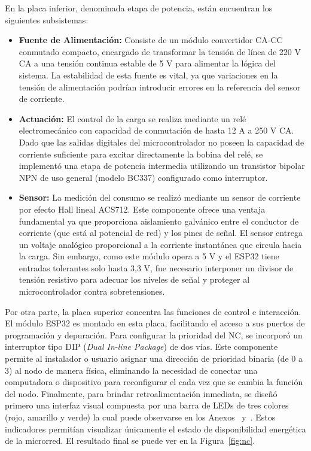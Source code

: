 En la placa inferior, denominada etapa de potencia, están encuentran los siguientes subsistemas:
\begin{itemize}
    \item \textbf{Fuente de Alimentación:} Consiste de un módulo convertidor CA-CC conmutado compacto, encargado de transformar la tensión de línea de 220 V CA a una tensión continua estable de 5 V para alimentar la lógica del sistema. La estabilidad de esta fuente es vital, ya que variaciones en la tensión de alimentación podrían introducir errores en la referencia del sensor de corriente.
    \item \textbf{Actuación:} El control de la carga se realiza mediante un relé electromecánico con capacidad de conmutación de hasta 12 A a 250 V CA. Dado que las salidas digitales del microcontrolador no poseen la capacidad de corriente suficiente para excitar directamente la bobina del relé, se implementó una etapa de potencia intermedia utilizando un transistor bipolar NPN de uso general (modelo BC337) configurado como interruptor.
    \item \textbf{Sensor:} La medición del consumo se realizó mediante un sensor de corriente por efecto Hall lineal ACS712. Este componente ofrece una ventaja fundamental ya que proporciona aislamiento galvánico entre el conductor de corriente (que está al potencial de red) y los pines de señal. El sensor entrega un voltaje analógico proporcional a la corriente instantánea que circula hacia la carga. Sin embargo, como este módulo opera a 5 V y el ESP32 tiene entradas tolerantes solo hasta 3,3 V, fue necesario interponer un divisor de tensión resistivo para adecuar los niveles de señal y proteger al microcontrolador contra sobretensiones.
\end{itemize}

Por otra parte, la placa superior concentra las funciones de control e interacción. El módulo ESP32 es montado en esta placa, facilitando el acceso a sus puertos de programación y depuración. Para configurar la prioridad del NC, se incorporó un interruptor tipo DIP (\textit{Dual In-line Package}) de dos vías. Este componente permite al instalador o usuario asignar una dirección de prioridad binaria (de 0 a 3) al nodo de manera física, eliminando la necesidad de conectar una computadora o dispositivo para reconfigurar el  cada vez que se cambia la función del nodo. Finalmente, para brindar retroalimentación inmediata, se diseñó primero una interfaz visual compuesta por una barra de LEDs de tres colores (rojo, amarillo y verde) la cual puede observarse en los Anexos~ y~. Estos indicadores permitían visualizar únicamente el estado de disponibilidad energética de la microrred. El resultado final se puede ver en la Figura~\ref{fig:nc}.

